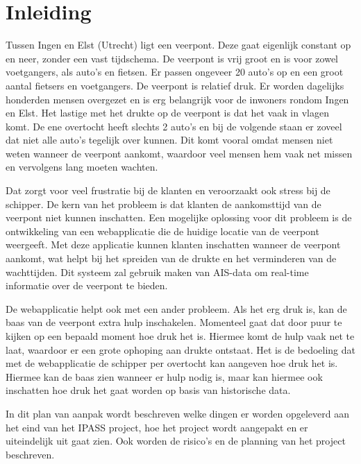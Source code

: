 \documentclass{article}
\begin{document}
\section{Inleiding}
Tussen Ingen en Elst (Utrecht) ligt een veerpont. Deze gaat eigenlijk constant op en neer, zonder een vast tijdschema.
De veerpont is vrij groot en is voor zowel voetgangers, als auto's en fietsen. Er passen ongeveer 20 auto's op en een groot aantal fietsers en voetgangers.
De veerpont is relatief druk. Er worden dagelijks honderden mensen overgezet en is erg belangrijk voor de inwoners rondom Ingen en Elst. Het lastige met het drukte op de veerpont is dat het vaak in vlagen komt. De ene overtocht heeft slechts 2 auto's en bij de volgende staan er zoveel dat niet alle auto's tegelijk over kunnen. Dit komt vooral omdat mensen niet weten wanneer de veerpont aankomt, waardoor veel mensen hem vaak net missen en vervolgens lang moeten wachten.
\par\smallskip 
Dat zorgt voor veel frustratie bij de klanten en veroorzaakt ook stress bij de schipper.
De kern van het probleem is dat klanten de aankomsttijd van de veerpont niet kunnen inschatten.
Een mogelijke oplossing voor dit probleem is de ontwikkeling van een webapplicatie die de huidige locatie van de veerpont weergeeft. Met deze applicatie kunnen klanten inschatten wanneer de veerpont aankomt, wat helpt bij het spreiden van de drukte en het verminderen van de wachttijden. Dit systeem zal gebruik maken van AIS-data om real-time informatie over de veerpont te bieden.
\par\smallskip 
De webapplicatie helpt ook met een ander probleem. Als het erg druk is, kan de baas van de veerpont extra hulp inschakelen. Momenteel gaat dat door puur te kijken op een bepaald moment hoe druk het is. 
Hiermee komt de hulp vaak net te laat, waardoor er een grote ophoping aan drukte ontstaat. Het is de bedoeling dat met de webapplicatie de schipper per overtocht kan aangeven hoe druk het is. Hiermee kan de baas zien wanneer er hulp nodig is, maar kan hiermee ook inschatten hoe druk het gaat worden op basis van historische data. 
\par\smallskip 
In dit plan van aanpak wordt beschreven welke dingen er worden opgeleverd aan het eind van het IPASS project, hoe het project wordt aangepakt en er uiteindelijk uit gaat zien.
Ook worden de risico's en de planning van het project beschreven.
\end{document}

